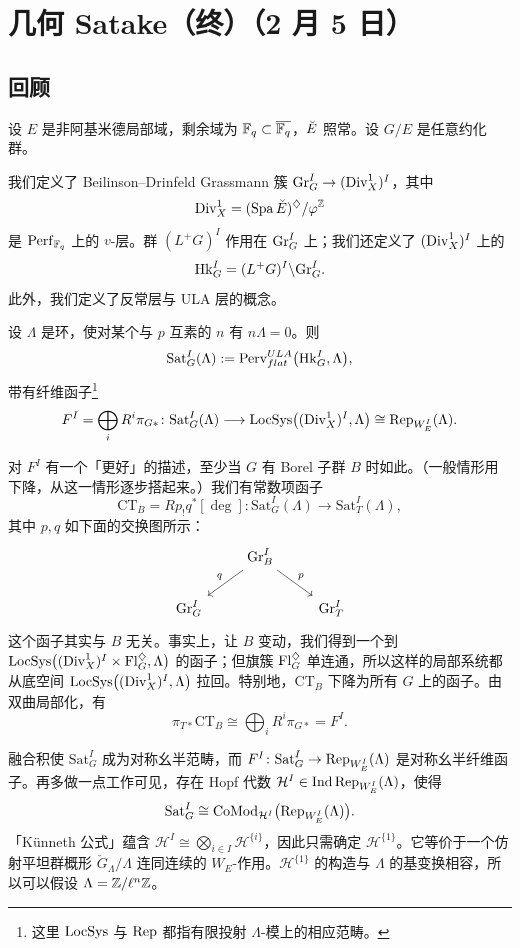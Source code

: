 \section[几何 Satake（终）]{几何 Satake（终）（2 月 5 日）}


\subsection{回顾}

设 $E$ 是非阿基米德局部域，剩余域为 $\mathbb{F}_q\subset\overline{\mathbb{F}_q}$，$\breve{E}$ 照常。设 $G/E$ 是任意约化群。

我们定义了 Beilinson--Drinfeld Grassmann 簇 $\mathrm{Gr}^I_G\to(\mathrm{Div}^1_X)^I$，其中
\[
\mathrm{Div}^1_X=(\operatorname{Spa}\breve{E})^{\diamondsuit}/\varphi^{\mathbb{Z}}
\]
是 $\mathrm{Perf}_{\mathbb{F}_q}$ 上的 $v$-层。群 $(L^+G)^I$ 作用在 $\mathrm{Gr}^I_G$ 上；我们还定义了 $(\mathrm{Div}^1_X)^I$ 上的
\[
\mathrm{Hk}^I_G=(L^+G)^I\backslash\mathrm{Gr}^I_G .
\]
此外，我们定义了反常层与 ULA 层的概念。

\begin{definition}[Satake 范畴]
设 $\Lambda$ 是环，使对某个与 $p$ 互素的 $n$ 有 $n\Lambda=0$。则
\[
\mathrm{Sat}^I_G(\Lambda):=\operatorname{Perv}^{ULA}_{flat}\bigl(\mathrm{Hk}^I_G,\Lambda\bigr),
\]
带有纤维函子\footnote{这里 $\mathrm{LocSys}$ 与 $\operatorname{Rep}$ 都指有限投射 $\Lambda$-模上的相应范畴。}
\[
F^I=\bigoplus_i R^i\pi_{G*}\colon\mathrm{Sat}^I_G(\Lambda)\longrightarrow
\mathrm{LocSys}\bigl((\mathrm{Div}^1_X)^I,\Lambda\bigr)\cong\operatorname{Rep}_{W^I_E}(\Lambda).
\]
\end{definition}

\begin{remark}
对 $F^I$ 有一个「更好」的描述，至少当 $G$ 有 Borel 子群 $B$ 时如此。（一般情形用下降，从这一情形逐步搭起来。）我们有常数项函子
\[
\mathrm{CT}_B=Rp_!q^*[\deg]\colon\mathrm{Sat}^I_G(\Lambda)\to\mathrm{Sat}^I_T(\Lambda),
\]
其中 $p,q$ 如下面的交换图所示：
\[
\begin{tikzcd}
& \Gr^I_B \arrow[dl, "q"'] \arrow[dr, "p"] & \\
\Gr^I_G & & \Gr^I_T
\end{tikzcd}
\]
这个函子其实与 $B$ 无关。事实上，让 $B$ 变动，我们得到一个到
$\mathrm{LocSys}\bigl((\mathrm{Div}^1_X)^I\times\mathrm{Fl}^{\diamondsuit}_G,\Lambda\bigr)$ 的函子；但旗簇
$\mathrm{Fl}^{\diamondsuit}_G$ 单连通，所以这样的局部系统都从底空间
$\mathrm{LocSys}\bigl((\mathrm{Div}^1_X)^I,\Lambda\bigr)$ 拉回。特别地，$\mathrm{CT}_B$ 下降为所有 $G$ 上的函子。由双曲局部化，有
\[
\pi_{T*}\mathrm{CT}_B\cong\bigoplus_i R^i\pi_{G*}=F^I .
\]
\end{remark}

融合积使 $\mathrm{Sat}^I_G$ 成为对称幺半范畴，而
$F^I\colon\mathrm{Sat}^I_G\to\operatorname{Rep}_{W^I_E}(\Lambda)$ 是对称幺半纤维函子。再多做一点工作可见，存在 Hopf 代数 $\mathcal{H}^I\in\operatorname{Ind}\operatorname{Rep}_{W^I_E}(\Lambda)$，使得
\[
\mathrm{Sat}^I_G\cong\mathrm{CoMod}_{\mathcal{H}^I}\bigl(\operatorname{Rep}_{W^I_E}(\Lambda)\bigr).
\]
「Künneth 公式」蕴含 $\mathcal{H}^I\cong\bigotimes_{i\in I}\mathcal{H}^{\{i\}}$，因此只需确定 $\mathcal{H}^{\{1\}}$。它等价于一个仿射平坦群概形 $\check G_\Lambda/\Lambda$ 连同连续的 $W_E$-作用。$\mathcal{H}^{\{1\}}$ 的构造与 $\Lambda$ 的基变换相容，所以可以假设 $\Lambda=\mathbb{Z}/\ell^n\mathbb{Z}$。

